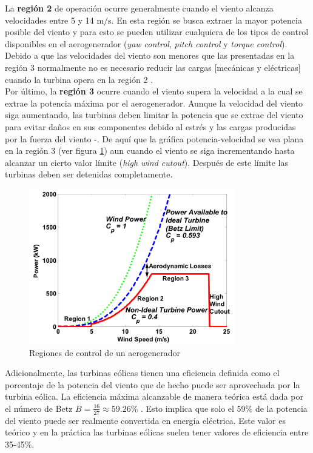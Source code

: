 {La \textbf{región 2} de operación ocurre generalmente cuando el viento alcanza velocidades 
entre 5 y 14 $\text{m}/\text{s}$. En esta región se busca extraer la mayor potencia posible 
del viento y para esto se pueden utilizar cualquiera de los tipos de control disponibles en 
el aerogenerador (\emph{yaw control}, \emph{pitch control} y \emph{torque control}). Debido 
a que las velocidades del viento son menores que las presentadas en la región 3 normalmente 
no es necesario reducir las cargas [mecánicas y eléctricas] cuando la turbina opera en la 
región 2 \cite{Johnson2004}.
\\

Por último, la \textbf{región 3} ocurre cuando el viento supera la velocidad a la cual se 
extrae la potencia máxima por el aerogenerador. Aunque la velocidad del viento siga aumentando, 
las turbinas deben limitar la potencia que se extrae del viento para evitar daños en sus 
componentes debido al estrés y las cargas producidas por la fuerza del viento 
\cite{Pao2009}-\cite{Johnson2004}. De aquí que la gráfica potencia-velocidad se vea plana 
en la región 3 (ver figura \ref{Regiones}) aun cuando el viento se siga incrementando hasta 
alcanzar un cierto valor límite (\emph{high wind cutout}). Después de este límite las turbinas 
deben ser detenidas completamente.
\\
\begin{figure}[H]
    \centering
    \includegraphics[width=0.8\textwidth]{Imagenes/Regions.jpeg}
    \caption{Regiones de control de un aerogenerador \cite{Johnson2004}}
    \label{Regiones}
\end{figure}

Adicionalmente, las turbinas eólicas tienen una eficiencia definida como el porcentaje de la 
potencia del viento que de hecho puede ser aprovechada por la turbina eólica. La eficiencia 
máxima alcanzable de manera teórica está dada por el número de Betz $B=\frac{16}{27}\approx 
59.26$\% \cite{Huleihil2012}. Esto implica que solo el 59\% de la potencia del viento puede 
ser realmente convertida en energía eléctrica. Este valor es teórico y en la práctica las 
turbinas eólicas suelen tener valores de eficiencia entre 35-45\%.
}

